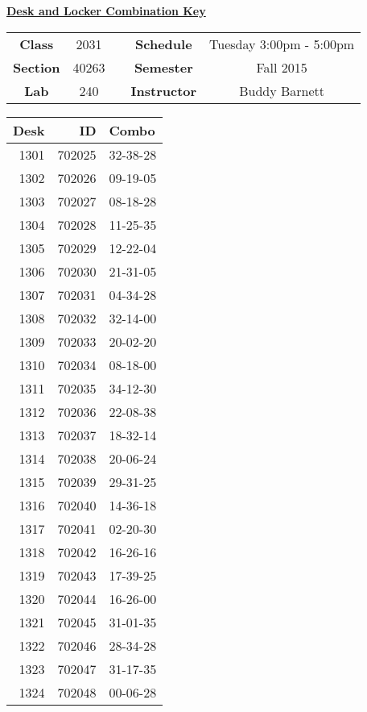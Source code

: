 \documentclass[12pt]{article}
\begin{document}
\thispagestyle{empty}

\begin{center}
	{\huge\textbf{\underline{ Desk and Locker Combination Key}}}
\end{center}


\begin{table}[h]
  \centering
  \begin{tabular}{ccccc}

  \textbf{Class} & 2031 & {\qquad} &\textbf{Schedule} & Tuesday 3:00pm - 5:00pm \\
  \textbf{Section} & 40263 & {\qquad} & \textbf{Semester} & Fall 2015 \\
  \textbf{Lab} & 240 & {\qquad} & \textbf{Instructor} & Buddy Barnett \\
  \end{tabular}
\end{table}
 \vspace{0.1in}
\begin{minipage}{0.4\textwidth}

\begin{tabular}{rrl}
\toprule
 Desk &      ID &     Combo \\
\midrule
 1301 &  702025 &  32-38-28 \\
 1302 &  702026 &  09-19-05 \\
 1303 &  702027 &  08-18-28 \\
 1304 &  702028 &  11-25-35 \\
 1305 &  702029 &  12-22-04 \\
 1306 &  702030 &  21-31-05 \\
 1307 &  702031 &  04-34-28 \\
 1308 &  702032 &  32-14-00 \\
 1309 &  702033 &  20-02-20 \\
 1310 &  702034 &  08-18-00 \\
 1311 &  702035 &  34-12-30 \\
 1312 &  702036 &  22-08-38 \\
 1313 &  702037 &  18-32-14 \\
 1314 &  702038 &  20-06-24 \\
 1315 &  702039 &  29-31-25 \\
 1316 &  702040 &  14-36-18 \\
 1317 &  702041 &  02-20-30 \\
 1318 &  702042 &  16-26-16 \\
 1319 &  702043 &  17-39-25 \\
 1320 &  702044 &  16-26-00 \\
 1321 &  702045 &  31-01-35 \\
 1322 &  702046 &  28-34-28 \\
 1323 &  702047 &  31-17-35 \\
 1324 &  702048 &  00-06-28 \\
\bottomrule
\end{tabular}


\end{minipage}
\end{document}

